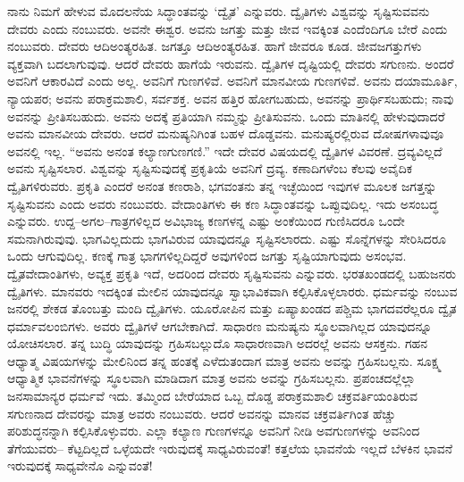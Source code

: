 ನಾನು ನಿಮಗೆ ಹೇಳುವ ಮೊದಲನೆಯ ಸಿದ್ಧಾಂತವನ್ನು ‘ದ್ವೈತ’ ಎನ್ನುವರು. ದ್ವೈತಿಗಳು ವಿಶ್ವವನ್ನು ಸೃಷ್ಟಿಸುವವನು ದೇವರು ಎಂದು ನಂಬುವರು. ಅವನೇ ಈಶ್ವರ. ಅವನು ಜಗತ್ತು ಮತ್ತು ಜೀವ ಇವಕ್ಕಿಂತ ಎಂದೆಂದಿಗೂ ಬೇರೆ ಎಂದು ನಂಬುವರು. ದೇವರು ಆದಿಅಂತ್ಯರಹಿತ. ಜಗತ್ತೂ ಆದಿಅಂತ್ಯರಹಿತ. ಹಾಗೆ ಜೀವರೂ ಕೂಡ. ಜೀವಜಗತ್ತುಗಳು ವ್ಯಕ್ತವಾಗಿ ಬದಲಾಗುವುವು. ಆದರೆ ದೇವರು ಹಾಗೆಯೆ ಇರುವನು. ದ್ವೈತಿಗಳ ದೃಷ್ಟಿಯಲ್ಲಿ ದೇವರು ಸಗುಣನು. ಅಂದರೆ ಅವನಿಗೆ ಆಕಾರವಿದೆ ಎಂದು ಅಲ್ಲ. ಅವನಿಗೆ ಗುಣಗಳಿವೆ. ಅವನಿಗೆ ಮಾನವೀಯ ಗುಣಗಳಿವೆ. ಅವನು ದಯಾಮೂರ್ತಿ, ನ್ಯಾಯಪರ; ಅವನು ಪರಾಕ್ರಮಶಾಲಿ, ಸರ್ವಶಕ್ತ. ಅವನ ಹತ್ತಿರ ಹೋಗಬಹುದು, ಅವನನ್ನು ಪ್ರಾರ್ಥಿಸಬಹುದು; ನಾವು ಅವನನ್ನು ಪ್ರೀತಿಸಬಹುದು. ಅವನು ಅದಕ್ಕೆ ಪ್ರತಿಯಾಗಿ ನಮ್ಮನ್ನು ಪ್ರೀತಿಸುವನು. ಒಂದು ಮಾತಿನಲ್ಲಿ ಹೇಳುವುದಾದರೆ ಅವನು ಮಾನವೀಯ ದೇವರು. ಆದರೆ ಮನುಷ್ಯನಿಗಿಂತ ಬಹಳ ದೊಡ್ಡವನು. ಮನುಷ್ಯರಲ್ಲಿರುವ ದೋಷಗಳಾವುವೂ ಅವನಲ್ಲಿ ಇಲ್ಲ. “ಅವನು ಅನಂತ ಕಲ್ಯಾಣಗುಣಗಣಿ.” ಇದೇ ದೇವರ ವಿಷಯದಲ್ಲಿ ದ್ವೈತಿಗಳ ವಿವರಣೆ. ದ್ರವ್ಯವಿಲ್ಲದೆ ಅವನು ಸೃಷ್ಟಿಸಲಾರ. ವಿಶ್ವವನ್ನು ಸೃಷ್ಟಿಸುವುದಕ್ಕೆ ಪ್ರಕೃತಿಯೆ ಅವನಿಗೆ ದ್ರವ್ಯ. ಕಣಾದಿಗಳೆಂಬ ಕೆಲವು ಅವೈದಿಕ ದ್ವೈತಿಗಳಿರುವರು. ಪ್ರಕೃತಿ ಎಂದರೆ ಅನಂತ ಕಣರಾಶಿ, ಭಗವಂತನು ತನ್ನ ಇಚ್ಛೆಯಿಂದ ಇವುಗಳ ಮೂಲಕ ಜಗತ್ತನ್ನು ಸೃಷ್ಟಿಸುವನು ಎಂದು ಅವರು ನಂಬುವರು. ವೇದಾಂತಿಗಳು ಈ ಕಣ ಸಿದ್ಧಾಂತವನ್ನು ಒಪ್ಪುವುದಿಲ್ಲ. ಇದು ಅಸಂಬದ್ಧ ಎನ್ನುವರು. ಉದ್ದ–ಅಗಲ–ಗಾತ್ರಗಳಿಲ್ಲದ ಅವಿಭಾಜ್ಯ ಕಣಗಳನ್ನ ಎಷ್ಟು ಅಂಕೆಯಿಂದ ಗುಣಿಸಿದರೂ ಒಂದೇ ಸಮನಾಗಿರುವುವು. ಭಾಗವಿಲ್ಲದುದು ಭಾಗವಿರುವ ಯಾವುದನ್ನೂ ಸೃಷ್ಟಿಸಲಾರದು. ಎಷ್ಟು ಸೊನ್ನೆಗಳನ್ನು ಸೇರಿಸಿದರೂ ಒಂದು ಆಗುವುದಿಲ್ಲ. ಕಣಕ್ಕೆ ಗಾತ್ರ ಭಾಗಗಳಿಲ್ಲದಿದ್ದರೆ ಅವುಗಳಿಂದ ಜಗತ್ತು ಸೃಷ್ಟಿಯಾಗುವುದು ಅಸಂಭವ. ದ್ವೈತವೇದಾಂತಿಗಳು, ಅವ್ಯಕ್ತ ಪ್ರಕೃತಿ ಇದೆ, ಅದರಿಂದ ದೇವರು ಸೃಷ್ಟಿಸುವನು ಎನ್ನುವರು. ಭರತಖಂಡದಲ್ಲಿ ಬಹುಜನರು ದ್ವೈತಿಗಳು. ಮಾನವರು ಇದಕ್ಕಿಂತ ಮೇಲಿನ ಯಾವುದನ್ನೂ ಸ್ವಾಭಾವಿಕವಾಗಿ ಕಲ್ಪಿಸಿಕೊಳ್ಳಲಾರರು. ಧರ್ಮವನ್ನು ನಂಬುವ ಜನರಲ್ಲಿ ಶೇಕಡ ತೊಂಬತ್ತು ಮಂದಿ ದ್ವೈತಿಗಳು. ಯೂರೋಪಿನ ಮತ್ತು ಏಷ್ಯಾಖಂಡದ ಪಶ್ಚಿಮ ಭಾಗದವರೆಲ್ಲರೂ ದ್ವೈತ ಧರ್ಮಾವಲಂಬಿಗಳು. ಅವರು ದ್ವೈತಿಗಳೆ ಆಗಬೇಕಾಗಿದೆ. ಸಾಧಾರಣ ಮನುಷ್ಯನು ಸ್ಥೂಲವಾಗಿಲ್ಲದ ಯಾವುದನ್ನೂ ಯೋಚಿಸಲಾರ. ತನ್ನ ಬುದ್ಧಿ ಯಾವುದನ್ನು ಗ್ರಹಿಸಬಲ್ಲುದೊ ಸಾಧಾರಣವಾಗಿ ಅದರಲ್ಲೆ ಅವನು ಆಸಕ್ತನು. ಗಹನ ಆಧ್ಯಾತ್ಮ ವಿಷಯಗಳನ್ನು ಮೇಲಿನಿಂದ ತನ್ನ ಹಂತಕ್ಕೆ ಎಳೆದುತಂದಾಗ ಮಾತ್ರ ಅವನು ಅವನ್ನು ಗ್ರಹಿಸಬಲ್ಲನು. ಸೂಕ್ಷ್ಮ ಆಧ್ಯಾತ್ಮಿಕ ಭಾವನೆಗಳನ್ನು ಸ್ಥೂಲವಾಗಿ ಮಾಡಿದಾಗ ಮಾತ್ರ ಅವನು ಅವನ್ನು ಗ್ರಹಿಸಬಲ್ಲನು. ಪ್ರಪಂಚದಲ್ಲೆಲ್ಲಾ ಜನಸಾಮಾನ್ಯರ ಧರ್ಮವೆ ಇದು. ತಮ್ಮಿಂದ ಬೇರೆಯಾದ ಒಬ್ಬ ದೊಡ್ಡ ಪರಾಕ್ರಮಶಾಲಿ ಚಕ್ರವರ್ತಿಯಂತಿರುವ ಸಗುಣನಾದ ದೇವರನ್ನು ಮಾತ್ರ ಅವರು ನಂಬುವರು. ಆದರೆ ಅವನನ್ನು ಮಾನವ ಚಕ್ರವರ್ತಿಗಿಂತ ಹೆಚ್ಚು ಪರಿಶುದ್ಧನನ್ನಾಗಿ ಕಲ್ಪಿಸಿಕೊಳ್ಳುವರು. ಎಲ್ಲಾ ಕಲ್ಯಾಣ ಗುಣಗಳನ್ನೂ ಅವನಿಗೆ ನೀಡಿ ಅವಗುಣಗಳನ್ನು ಅವನಿಂದ ತೆಗೆಯುವರು– ಕೆಟ್ಟದಿಲ್ಲದೆ ಒಳ್ಳೆಯದೇ ಇರುವುದಕ್ಕೆ ಸಾಧ್ಯವಿರುವಂತೆ! ಕತ್ತಲೆಯ ಭಾವನೆಯೆ ಇಲ್ಲದೆ ಬೆಳಕಿನ ಭಾವನೆ ಇರುವುದಕ್ಕೆ ಸಾಧ್ಯವೇನೊ ಎನ್ನುವಂತೆ!

